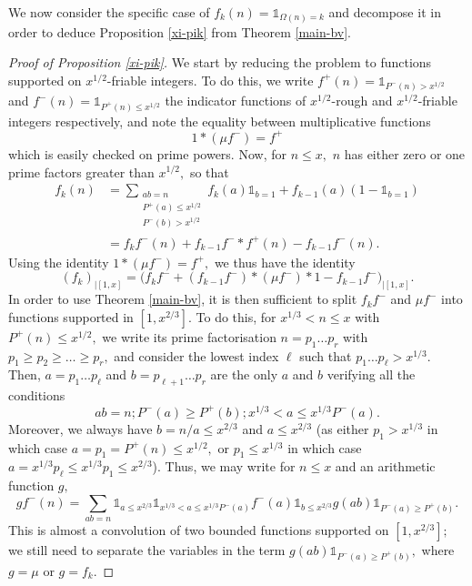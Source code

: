 \documentclass{article}
\newcommand{\Ind}{\mathbb{1}}
\begin{document}
We now consider the specific case of $f_k(n) = \Ind_{\Omega(n) = k}$ and decompose it in order to deduce Proposition \ref{xi-pik} from Theorem \ref{main-bv}.

\begin{proof}[Proof of Proposition \ref{xi-pik}]
    We start by reducing the problem to functions supported on $x^{1/2}$-friable integers. To do this, we write $f^+(n) = \Ind_{P^-(n) > x^{1/2}}$ and $f^-(n) = \Ind_{P^+(n) \le x^{1/2}}$ the indicator functions of $x^{1/2}$-rough and $x^{1/2}$-friable integers respectively,  and note the equality between multiplicative functions
    $$1 * (\mu f^-) = f^+$$ which is easily checked on prime powers. Now, for $n\le x,$ $n$ has either zero or one prime factors greater than $x^{1/2},$ so that
    \begin{align*}
        f_k(n) &= \sum_{\substack{ab = n \\ P^+(a) \le x^{1/2} \\ P^-(b) > x^{1/2}}} f_k(a) \Ind_{b=1} + f_{k-1}(a) (1 -\Ind_{b=1})
        \\&= f_k f^- (n) + f_{k-1} f^- * f^+ (n) - f_{k-1} f^- (n).
    \end{align*}
    Using the identity $1 * (\mu f^-) = f^+,$ we thus have the identity
    \begin{equation}\label{step8}
        (f_k)_{|[1,x]} = \big(f_k f^- + (f_{k-1} f^-) * (\mu f^-) * 1 - f_{k-1} f^-\big)_{|[1,x]}. 
    \end{equation}
    In order to use Theorem \ref{main-bv}, it is then sufficient to split $f_k f^-$ and $\mu f^-$ into functions supported in $[1, x^{2/3}].$ To do this, for $x^{1/3} < n \le x$ with $P^+(n) \le x^{1/2},$ we write its prime factorisation $n = p_1 \ldots p_r$ with $p_1 \ge p_2 \ge \ldots \ge p_r,$ and consider the lowest index $\ell$ such that $p_1\ldots p_\ell > x^{1/3}.$ Then, $a = p_1\ldots p_\ell$ and $b = p_{\ell+1}\ldots p_r$ are the only $a$ and $b$ verifying all the conditions $$ab = n ; P^-(a) \ge P^+(b) ; x^{1/3} < a \le x^{1/3}P^{-}(a).$$ Moreover, we always have $b = n/a \le x^{2/3}$ and $a\le x^{2/3}$ (as either $p_1 > x^{1/3}$ in which case $a = p_1 = P^+(n) \le x^{1/2},$ or $p_1 \le x^{1/3}$ in which case $a = x^{1/3}p_\ell \le x^{1/3} p_1 \le x^{2/3}$). Thus, we may write for $n\le x$ and an arithmetic function $g,$
    \begin{equation}\label{step9}
        gf^{-}(n) = \sum_{ab = n} \Ind_{a \le x^{2/3}} \Ind_{x^{1/3} < a \le x^{1/3}P^{-}(a)} f^-(a) \Ind_{b \le x^{2/3}} g(ab) \Ind_{P^-(a) \ge P^+(b)}.
    \end{equation}
    This is almost a convolution of two bounded functions supported on $[1, x^{2/3}];$ we still need to separate the variables in the term $g(ab) \Ind_{P^-(a) \ge P^+(b)},$ where $g = \mu$ or $g = f_k.$


\end{proof}
\end{document}
